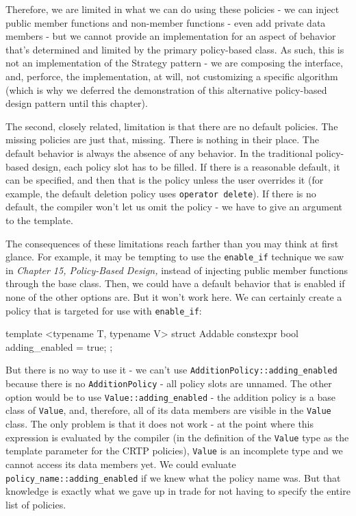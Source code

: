 Therefore, we are limited in what we can do using these policies - we can inject public member functions and non-member functions - even add private data members - but we cannot provide an implementation for an aspect of behavior that's determined and limited by the primary policy-based class. As such, this is not an implementation of the Strategy pattern - we are composing the interface, and, perforce, the implementation, at will, not customizing a specific algorithm (which is why we deferred the demonstration of this alternative policy-based design pattern until this chapter).

The second, closely related, limitation is that there are no default policies. The missing policies are just that, missing. There is nothing in their place. The default behavior is always the absence of any behavior. In the traditional policy-based design, each policy slot has to be filled. If there is a reasonable default, it can be specified, and then that is the policy unless the user overrides it (for example, the default deletion policy uses \texttt{operator\ delete}). If there is no default, the compiler won't let us omit the policy - we have to give an argument to the template.

The consequences of these limitations reach farther than you may think at first glance. For example, it may be tempting to use the \texttt{enable\_if} technique we saw in \emph{Chapter 15, Policy-Based Design,} instead of injecting public member functions through the base class. Then, we could have a default behavior that is enabled if none of the other options are. But it won't work here. We can certainly create a policy that is targeted for use with \texttt{enable\_if}:

\begin{code}
template <typename T, typename V> struct Addable {
  constexpr bool adding_enabled = true;
};
\end{code}

But there is no way to use it - we can't use \texttt{AdditionPolicy::adding\_enabled} because there is no \texttt{AdditionPolicy} - all policy slots are unnamed. The other option would be to use \texttt{Value::adding\_enabled} - the addition policy is a base class of \texttt{Value}, and, therefore, all of its data members are visible in the \texttt{Value} class. The only problem is that it does not work - at the point where this expression is evaluated by the compiler (in the definition of the \texttt{Value} type as the template parameter for the CRTP policies), \texttt{Value} is an incomplete type and we cannot access its data members yet. We could evaluate \texttt{policy\_name::adding\_enabled} if we knew what the policy name was. But that knowledge is exactly what we gave up in trade for not having to specify the entire list of policies.

